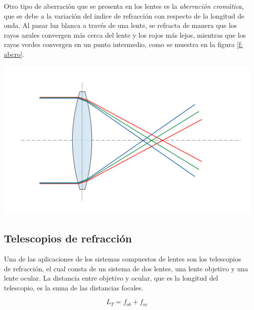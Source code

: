 \documentclass[a4paper,12pt]{article}
\newenvironment{Figure}
  {\par\medskip\noindent\minipage{\linewidth}}
  {\endminipage\par\medskip}
\begin{document}
\begin{multicols*}{2}
        Otro tipo de aberración que se presenta en los lentes es la \emph{aberración cromática}, que se debe a la variación del indice de refracción con respecto de la longitud de onda. Al pasar luz blanca a través de una lente, se refracta de manera que los rayos azules convergen más cerca del lente y los rojos más lejos, mientras que los rayos verdes convergen en un punto intermedio, como se muestra en la figura \ref{f: abcro}.

        \begin{Figure}
            \centering
            \includegraphics[width=0.9\linewidth]{AberracionCromatica.png}
            \label{f: abcro}
        \end{Figure}
        
    \subsection*{Telescopios de refracción}

        Una de las aplicaciones de los sistemas compuestos de lentes son los telescopios de refracción, el cual consta de un sistema de dos lentes, una lente objetivo y una lente ocular. La distancia entre objetivo y ocular, que es la longitud del telescopio, es la suma de las distancias focales.

        \begin{equation} \label{eq:disTel}
            L_{T}=f_{ob}+f_{oc}
        \end{equation}


\end{multicols*}
\end{document}

